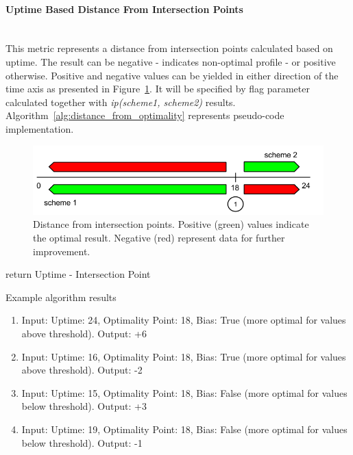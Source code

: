 \documentclass[]{final_report}
\newcommand{\myparagraph}[1]{\paragraph{#1}\mbox{}\\}
\begin{document}
\myparagraph{Uptime Based Distance From Intersection Points}

This metric represents a distance from intersection points calculated based on uptime. The result can be negative - indicates non-optimal profile - or positive otherwise. Positive and negative values can be yielded in either direction of the time axis as presented in Figure~\ref{fig:distance}. 
It will be specified by flag parameter calculated together with \textit{ip(scheme1, scheme2)} results. Algorithm~\ref{alg:distance_from_optimality} represents pseudo-code implementation.

\begin{figure}[H]
       \includegraphics[width=\linewidth]{figures/distance}
      \caption{Distance from intersection points. Positive (green) values indicate the optimal result. Negative (red) represent data for further improvement.}
        \label{fig:distance}
\end{figure}

\begin{algorithm}[H]
 \label{alg:distance_from_optimality}
   {
        return Uptime - Intersection Point
  } 
\caption{Uptime Based Distance From Intersection Points}
\end{algorithm}

Example algorithm results
\begin{enumerate}
\item Input: Uptime: 24, Optimality Point: 18, Bias: True (more optimal for values above threshold). Output: +6
\item Input: Uptime: 16, Optimality Point: 18, Bias: True (more optimal for values above threshold). Output: -2
\item Input: Uptime: 15, Optimality Point: 18, Bias: False (more optimal for values below threshold). Output: +3
\item Input: Uptime: 19, Optimality Point: 18, Bias: False (more optimal for values below threshold). Output: -1
\end{enumerate}
\end{document}
